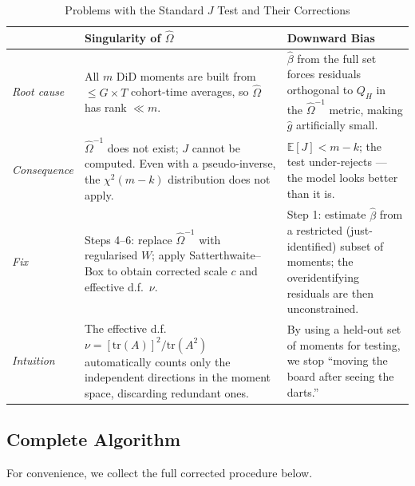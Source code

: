 \begin{table}[htbp]
\centering
\caption{Problems with the Standard $J$ Test and Their Corrections}
\label{tab:correction_summary}
\begin{tabular}{p{3.2cm} p{4.5cm} p{4.5cm}}
\toprule
 & \textbf{Singularity of $\hat\Omega$}
 & \textbf{Downward Bias} \\
\midrule
\textit{Root cause}
  & All $m$ DiD moments are built from $\leq G\times T$ cohort-time
    averages, so $\hat\Omega$ has rank $\ll m$.
  & $\hat\beta$ from the full set forces residuals orthogonal to $Q_H$
    in the $\hat\Omega^{-1}$ metric, making $\hat g$ artificially small.\\[6pt]
\textit{Consequence}
  & $\hat\Omega^{-1}$ does not exist; $J$ cannot be computed.
    Even with a pseudo-inverse, the $\chi^2(m-k)$ distribution does
    not apply.
  & $\mathbb{E}[J] < m - k$; the test under-rejects --- the model
    looks better than it is. \\[6pt]
\textit{Fix}
  & Steps 4--6: replace $\hat\Omega^{-1}$ with regularised $W$;
    apply Satterthwaite--Box to obtain corrected scale $c$ and
    effective d.f.\ $\nu$.
  & Step 1: estimate $\hat\beta$ from a restricted (just-identified)
    subset of moments; the overidentifying residuals are then
    unconstrained. \\[6pt]
\textit{Intuition}
  & The effective d.f.\ $\nu = [\mathrm{tr}(A)]^2/\mathrm{tr}(A^2)$
    automatically counts only the independent directions in the moment
    space, discarding redundant ones.
  & By using a held-out set of moments for testing, we stop
    ``moving the board after seeing the darts.'' \\
\bottomrule
\end{tabular}
\end{table}

\subsection{Complete Algorithm}
\label{subsec:algorithm}

For convenience, we collect the full corrected procedure below.

